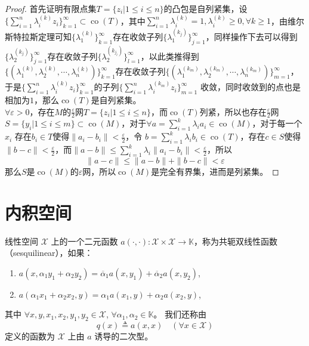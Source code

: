 \documentclass[lang=cn,newtx,10pt,scheme=chinese,thmcnt=chapter]{elegantbook}
\begin{document}
\begin{proof}
首先证明有限点集$T=\{z_i|1\leqslant i\leqslant n\}$的凸包是自列紧集，设$\{\sum\limits_{i=1}^n \lambda_i^{(k)}z_i \}_{k=1}^\infty\subset \operatorname{co}(T)$，其中$\sum\limits_{i=1}^n\lambda_{i}^{(k)}=1,\lambda_i^{(k)}\geqslant 0,\forall k\geqslant 1$，由维尔斯特拉斯定理可知$\{\lambda_{1}^{(k)}\}_{k=1}^\infty$存在收敛子列$\{\lambda_{1}^{(k_j)}\}_{j=1}^\infty$，同样操作下去可以得到$\{\lambda_{2}^{(k_j)}\}_{j=1}^\infty$存在收敛子列$\{\lambda_{2}^{(k_{j_l})}\}_{l=1}^\infty$，以此类推得到$\{(\lambda_1^{(k)},\lambda_2^{(k)},\cdots,\lambda_n^{(k)})\}_{k=1}^\infty$存在收敛子列$\{(\lambda_1^{(k_m)},\lambda_2^{(k_m)},\cdots,\lambda_n^{(k_m)})\}_{m=1}^\infty$，于是$\{\sum\limits_{i=1}^n \lambda_i^{(k)}z_i \}_{k=1}^\infty$的子列$\{\sum\limits_{i=1}^n \lambda_i^{(k_m)}z_i \}_{m=1}^\infty$
    收敛，同时收敛到的点也是相加为$1$，那么$\operatorname{co}(T)$是自列紧集。\\
    $\forall \varepsilon>0$，存在$M$的$\frac{\varepsilon}{2}$网$T=\{z_i|1\leqslant i\leqslant n\}$，而$\operatorname{co}(T)$列紧，所以也存在$\frac{\varepsilon}{2}$网$S=\{y_i|1\leqslant i\leqslant m\}\subset \operatorname{co}(M)$，对于$\forall a=\sum\limits_{i=1}^k \lambda_ia_i\in \operatorname{co}(M)$，对于每一个$x_i$
 存在$b_i\in T$使得$\|a_i-b_i\|<\frac{\varepsilon}{2}$，令  $ b=\sum\limits_{i=1}^k \lambda_ib_i\in \operatorname{co}(T)$，存在$c\in S$使得$\|b-c\|<\frac{\varepsilon}{2}$，而$\|a-b\|\leqslant \sum\limits_{i=1}^k \lambda_i\|a_i-b_i\|<\frac{\varepsilon}{2}$，所以
 \[
 \|a-c\|\leqslant\|a-b\|+\|b-c\|<\varepsilon
 \]
 那么$S$是$\operatorname{co}(M)$的$\varepsilon$网，所以$\operatorname{co}(M)$是完全有界集，进而是列紧集。

 
\end{proof}

\section{内积空间}
\begin{definition}
线性空间 $\mathscr{X}$ 上的一个二元函数 $a(\cdot, \cdot): \mathscr{X} \times \mathscr{X} \to \mathbb{K}$，称为共轭双线性函数（sesquilinear），如果：
\begin{enumerate}
    \item $a\left(x, \alpha_1 y_1 + \alpha_2 y_2\right) = \overline{\alpha}_1 a\left(x, y_1\right) + \overline{\alpha}_2 a\left(x, y_2\right)$,
    \item $a\left(\alpha_1 x_1 + \alpha_2 x_2, y\right) = \alpha_1 a\left(x_1, y\right) + \alpha_2 a\left(x_2, y\right)$,
\end{enumerate}
其中 $\forall x, y, x_1, x_2, y_1, y_2 \in \mathscr{X}$, $\forall \alpha_1, \alpha_2 \in \mathbb{K}$。  
我们还称由
\[
q(x) \triangleq a(x, x) \quad (\forall x \in \mathscr{X})
\]
定义的函数为 $\mathscr{X}$ 上由 $a$ 诱导的二次型。
\end{definition}
\end{document}
